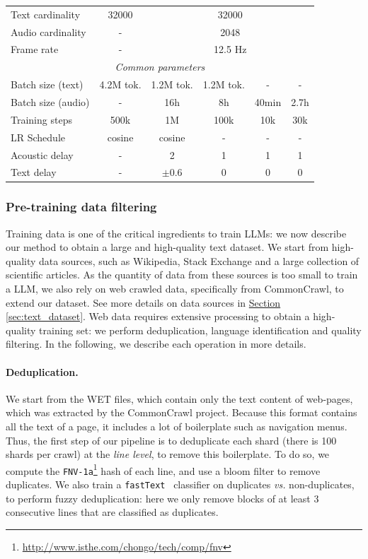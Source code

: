\begin{table}[t]
\begin{tabular}{l|c|cccc}
    \midrule[0.3pt]
    Text cardinality & 32000 & \multicolumn{4}{c}{32000}\\
    Audio cardinality & - & \multicolumn{4}{c}{2048}\\
    Frame rate & - & \multicolumn{4}{c}{12.5 Hz} \\
    \midrule
    \multicolumn{6}{c}{\textit{Common parameters}} \\
    \midrule[0.3pt]
    Batch size (text)    & 4.2M tok. & 1.2M tok. & 1.2M tok. &  - & - \\
    Batch size (audio)   & - & 16h & 8h & 40min & 2.7h\\
    Training steps       & 500k & 1M & 100k & 10k & 30k \\
    LR Schedule          & cosine & cosine & - & - & -\\
    Acoustic delay       & - & 2 & 1 & 1 & 1 \\
    Text delay           & - & $\pm$0.6 & 0 & 0 & 0 \\
    \bottomrule
  \end{tabular}
\end{table}

\subsubsection{Pre-training data filtering}
\label{sec:data_filtering}
Training data is one of the critical ingredients to train LLMs: we now describe our method to obtain a large and high-quality text dataset.
We start from high-quality data sources, such as Wikipedia, Stack Exchange and a large collection of scientific articles.
As the quantity of data from these sources is too small to train a LLM, we also rely on web crawled data, specifically from CommonCrawl, to extend our dataset. See more details on data sources in \hyperref[sec:text_dataset]{Section \ref{sec:text_dataset}}. 
Web data requires extensive processing to obtain a high-quality training set: we perform deduplication, language identification and quality filtering.
In the following, we describe each operation in more details.

\paragraph{Deduplication.}
We start from the WET files, which contain only the text content of web-pages, which was extracted by the CommonCrawl project.
Because this format contains all the text of a page, it includes a lot of boilerplate such as navigation menus.
Thus, the first step of our pipeline is to deduplicate each shard (there is 100 shards per crawl) at the \emph{line level}, to remove this boilerplate.
To do so, we compute the \texttt{FNV-1a}\footnote{\url{http://www.isthe.com/chongo/tech/comp/fnv}} hash of each line, and use a bloom filter to remove duplicates.
We also train a \texttt{fastText}~\citep{joulin2016bag} classifier on duplicates \emph{vs.} non-duplicates, to perform fuzzy deduplication:
here we only remove blocks of at least 3 consecutive lines that are classified as duplicates.


